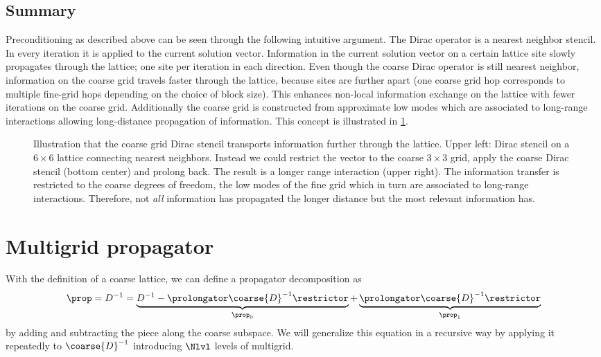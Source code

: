 \subsection{Summary}

Preconditioning as described above can be seen through the following intuitive argument.
The Dirac operator is a nearest neighbor stencil.
In every iteration it is applied to the current solution vector.
Information in the current solution vector on a certain lattice site slowly propagates through the lattice; one site per iteration in each direction.
Even though the coarse Dirac operator is still nearest neighbor, information on the coarse grid travels faster through the lattice, because sites are further apart (\ie one coarse grid hop corresponds to multiple fine-grid hops depending on the choice of block size).
This enhances non-local information exchange on the lattice with fewer iterations on the coarse grid.
Additionally the coarse grid is constructed from approximate low modes which are associated to long-range interactions allowing long-distance propagation of information.
This concept is illustrated in \cref{fig:coarse:stencil}.

\begin{figure}
\centering

\caption{Illustration that the coarse grid Dirac stencil transports information further through the lattice. Upper left: Dirac stencil on a $6 \times 6$ lattice connecting nearest neighbors. Instead we could restrict the vector to the coarse $3 \times 3$ grid, apply the coarse Dirac stencil (bottom center) and prolong back. The result is a longer range interaction (upper right). The information transfer is restricted to the coarse degrees of freedom, \ie the low modes of the fine grid which in turn are associated to long-range interactions. Therefore, not \emph{all} information has propagated the longer distance but the most relevant information has.}
\label{fig:coarse:stencil}
\end{figure}

\section{Multigrid propagator}
\label{sec:mg:prop}

With the definition of a coarse lattice, we can define a propagator decomposition as
\begin{equation} \label{eq:mg:prop:decomp:2lvl}
\prop = D^{-1}
= \underbrace{
  D^{-1}
  - \prolongator \coarse{D}^{-1} \restrictor
}_{\prop_0}
+ \underbrace{
  \prolongator \coarse{D}^{-1} \restrictor
}_{\prop_1}
\end{equation}
by adding and subtracting the piece along the coarse subspace.
We will generalize this equation in a recursive way by applying it repeatedly to $\coarse{D}^{-1}$ introducing $\Nlvl$ levels of multigrid.

